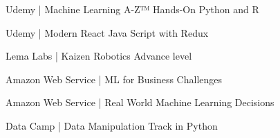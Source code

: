 \documentclass[15pt, a4paper]{awesome-cv}
\begin{document}

\makecvheader[C]








% 
% 
% 
% 
% 
\begin{cvcerti}
    \cventry
        {} %
        {} %
        {} %
        {} %
        {
        \vspace{-0.5cm}
        \begin{cvitems} %
        \begin{multicols}{2}
             \normalsize{\item {Udemy | Machine Learning A-Z™ Hands-On Python and R} 
             \item {Udemy | Modern React Java Script with Redux}
             \item {Lema Labs | Kaizen Robotics Advance level} 
             \item{Amazon Web Service | ML for Business Challenges } 
             \item{Amazon Web Service | Real World Machine Learning Decisions}
             \item{Data Camp | Data Manipulation Track in Python}}
        \end{multicols}
        \end{cvitems}
        }  
\end{cvcerti}
\end{document}
